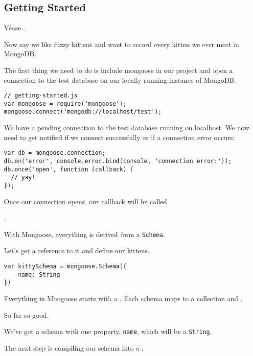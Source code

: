 \subsection{Getting Started}

Véase
.

Now say we like fuzzy kittens and want to record every kitten we ever
meet in MongoDB. 

The first thing we need to do is include mongoose in
our project and open a connection to the test database on
our locally running instance of MongoDB.

\begin{verbatim}
// getting-started.js
var mongoose = require('mongoose');
mongoose.connect('mongodb://localhost/test');
\end{verbatim}

We have a pending connection to the test database running on localhost. We
now need to get notified if we connect successfully or if a connection
error occurs:

\begin{verbatim}
var db = mongoose.connection;
db.on('error', console.error.bind(console, 'connection error:'));
db.once('open', function (callback) {
  // yay!
});
\end{verbatim}

Once our connection opens, our callback will be called. 

.

With Mongoose, everything is derived from a 
\verb|Schema|. 

Let's get a reference to it and define our kittens.

\begin{verbatim}
var kittySchema = mongoose.Schema({
    name: String
})
\end{verbatim}
Everything in Mongoose starts with a 
. 
Each schema maps to a  collection and .

So far so good. 

We've got a schema with one property, \verb|name|, which will be a \verb|String|. 

The next step is compiling our schema into a 
.

